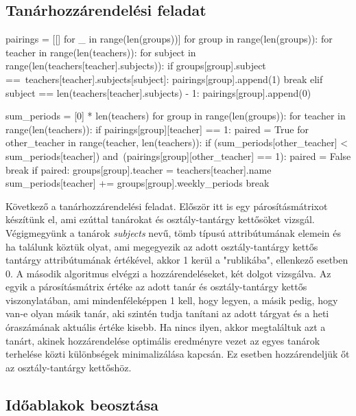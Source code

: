 \subsection{Tanárhozzárendelési feladat}

\begin{python}
pairings = [[] for _ in range(len(groups))]
for group in range(len(groups)):
    for teacher in range(len(teachers)):
        for subject in range(len(teachers[teacher].subjects)):
            if groups[group].subject ==\
               teachers[teacher].subjects[subject]:
                pairings[group].append(1)
                break
            elif subject == len(teachers[teacher].subjects) - 1:
                pairings[group].append(0)

sum_periods = [0] * len(teachers)
for group in range(len(groups)):
    for teacher in range(len(teachers)):
        if pairings[group][teacher] == 1:
            paired = True
            for other_teacher in range(teacher, len(teachers)):
                if (sum_periods[other_teacher] < 
                   sum_periods[teacher]) and\
                   (pairings[group][other_teacher] == 1):
                    paired = False
                    break
            if paired:
                groups[group].teacher = teachers[teacher].name
                sum_periods[teacher] += groups[group].weekly_periods
                break
\end{python}

Következő a tanárhozzárendelési feladat. Először itt is egy párosításmátrixot készítünk el, ami ezúttal tanárokat és osztály-tantárgy kettősöket vizsgál. Végigmegyünk a tanárok \textit{subjects} nevű, tömb típusú attribútumának elemein és ha találunk köztük olyat, ami megegyezik az adott osztály-tantárgy kettős tantárgy attribútumának értékével, akkor 1 kerül a "rublikába", ellenkező esetben 0.
A második algoritmus elvégzi a hozzárendeléseket, két dolgot vizsgálva. Az egyik a párosításmátrix értéke az adott tanár és osztály-tantárgy kettős viszonylatában, ami mindenféleképpen 1 kell, hogy legyen, a másik pedig, hogy van-e olyan másik tanár, aki szintén tudja tanítani az adott tárgyat és a heti óraszámának aktuális értéke kisebb. Ha nincs ilyen, akkor megtaláltuk azt a tanárt, akinek hozzárendelése optimális eredményre vezet az egyes tanárok terhelése közti különbségek minimalizálása kapcsán. Ez esetben hozzárendeljük őt az osztály-tantárgy kettőshöz.

\subsection{Időablakok beosztása}

